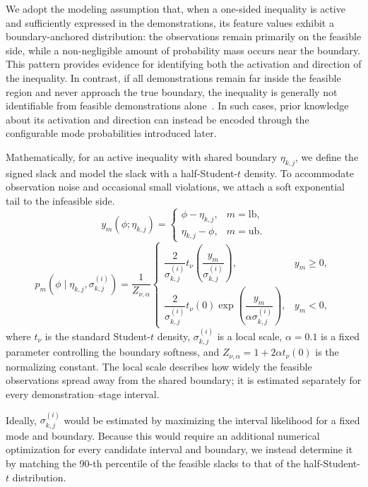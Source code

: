 We adopt the modeling assumption that, when a one-sided inequality is active and sufficiently expressed in the demonstrations, its feature values exhibit a boundary-anchored distribution: the observations remain primarily on the feasible side, while a non-negligible amount of probability mass occurs near the boundary. This pattern provides evidence for identifying both the activation and direction of the inequality. In contrast, if all demonstrations remain far inside the feasible region and never approach the true boundary, the inequality is generally not identifiable from feasible demonstrations alone~\cite{chou2020local}. In such cases, prior knowledge about its activation and direction can instead be encoded through the configurable mode probabilities introduced later.

Mathematically, for an active inequality with shared boundary $\eta_{k,j}$, we define the signed slack and model the slack with a half-Student-$t$ density. To accommodate observation noise and occasional small violations, we attach a soft exponential tail to the infeasible side.
\begin{equation}
y_m(\phi;\eta_{k,j})
=
\begin{cases}
\phi-\eta_{k,j}, & m=\mathrm{lb},\\
\eta_{k,j}-\phi, & m=\mathrm{ub}.
\end{cases}
\label{eq:inequality_signed_slack}
\end{equation}
\begin{equation}
p_m(\phi\mid\eta_{k,j},\sigma_{k,j}^{(i)})
=
\frac{1}{Z_{\nu,\alpha}}
\begin{cases}
\dfrac{2}{\sigma_{k,j}^{(i)}}
t_\nu\!\left(\dfrac{y_m}{\sigma_{k,j}^{(i)}}\right),
& y_m\geq0,\\[0.9em]
\dfrac{2}{\sigma_{k,j}^{(i)}}t_\nu(0)
\exp\!\left(\dfrac{y_m}{\alpha\sigma_{k,j}^{(i)}}\right),
& y_m<0,
\end{cases}
\label{eq:soft_half_t_density}
\end{equation}
where  $t_\nu$ is the standard Student-$t$ density, $\sigma_{k,j}^{(i)}$ is a local scale, $\alpha=0.1$ is a fixed parameter controlling the boundary softness, and $Z_{\nu,\alpha}=1+2\alpha t_\nu(0)$ is the normalizing constant. The local scale describes how widely the feasible observations spread away from the shared boundary; it is estimated separately for every demonstration--stage interval.

Ideally, $\sigma_{k,j}^{(i)}$ would be estimated by maximizing the interval likelihood for a fixed mode and boundary. Because this would require an additional numerical optimization for every candidate interval and boundary, we instead determine it by matching the 90-th percentile of the feasible slacks to that of the  half-Student-$t$ distribution.

